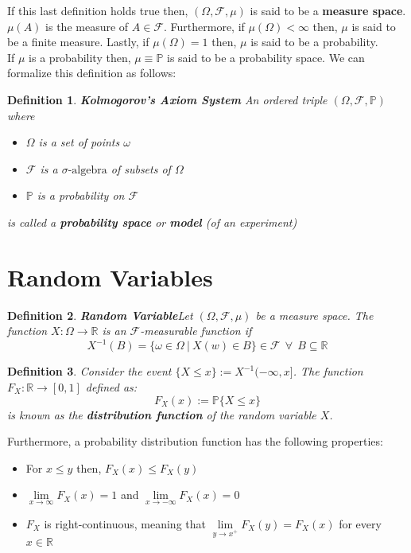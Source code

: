 \documentclass[11pt]{report}
\newtheorem{definition}{Definition}[chapter]
\newcommand{\RNums}{\mathbb{R}}
\newcommand{\salg}{\sigma\text{-algebra}}
\newcommand{\salgF}{\mathscr{F}}
\begin{document}
If this last definition holds true then, $(\Omega, \salgF, \mu)$ is said to be a \textbf{measure space}. $\mu(A)$ is the measure of $A\in\salgF$. Furthermore, if $\mu(\Omega) < \infty$ then, $\mu$ is said to be a finite measure. Lastly, if  $\mu(\Omega) = 1$ then, $\mu$ is said to be a probability.\\

If $\mu$ is a probability then, $\mu \equiv \mathbb{P}$ is said to be a probability space. We can formalize this definition as follows:

\begin{definition}{\textbf{Kolmogorov's Axiom System}}
	An ordered triple $(\Omega, \salgF, \mathbb{P})$ where
	\begin{itemize}
		\item $\Omega$ is a set of points $\omega$
		\item $\salgF$ is a $\salg$ of subsets of $\Omega$
		\item $\mathbb P$ is a probability on $\salgF$
	\end{itemize}
	is called a \textbf{probability space} or \textbf{model} (of an experiment)
\end{definition}

\section{Random Variables}
\begin{definition}{\textbf{Random Variable}}\label{rvar}
	Let $(\Omega, \salgF, \mu)$ be a measure space. The function $X: \Omega \rightarrow \RNums$ is an $\salgF$-measurable function if
	\begin{equation}
		X^{-1}(B) = \{\omega \in \Omega \ | \ X(w) \in B\} \in \salgF \ \ \forall \ \ B \subseteq \RNums
	\end{equation}
\end{definition}

\begin{definition}\label{dist_func}
	Consider the event $\{X \leq x\} := X^{-1}(-\infty, x]$. The function $F_X: \RNums \rightarrow [0, 1]$ defined as:
	\begin{equation}
		F_X(x) := \mathbb{P}\{X \leq x\}
	\end{equation}
	is known as the \textbf{distribution function} of the random variable $X$.
\end{definition}

Furthermore, a probability distribution function has the following properties:
\begin{itemize}
	\item For $x \leq y$ then, $F_X(x) \leq F_X(y)$
	\item $\lim\limits_{x\to\infty} F_X(x) = 1$ and $\lim\limits_{x\to - \infty} F_X(x) = 0$
	\item $F_X$ is right-continuous, meaning that $\lim\limits_{y\to x^+} F_X(y) = F_X(x)$ for every $x \in \RNums$
\end{itemize}
\end{document}
